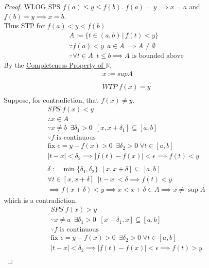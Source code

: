 \documentclass[11pt, oneside]{book}
\theoremstyle{break}
\newtheorem*{proof}{Proof}
\newcommand{\bb}[1]{\mathbb{#1}}			%
\begin{document}
\begin{proof}
	WLOG SPS $f(a) \leq y \leq f(b)$. $f(a) = y \implies x = a$ and $f(b) = y \implies x = b$. \\
	Thus STP for $f(a) < y < f(b)$
	\begin{gather*}
		A := \{t \in (a, b) \, | \, f(t) < y \} \\
		\because f(a) < y \enspace a \in A \implies A \neq \emptyset \\
		\because \forall t \in A \enspace t \leq b \implies A \text{ is bounded above}
	\end{gather*}
	By the \hyperref[completeness_R]{Completeness Property of $\bb{R}$},
	\begin{gather*}
		x := sup A \\
		\\
		WTP \; f(x) = y \\
	\end{gather*}
	Suppose, for contradiction, that $f(x) \neq y$.
	\begin{gather*}
		SPS \; f(x) < y \\
		\therefore x \in A \\
		\because x \neq b \enspace \exists \delta_1 > 0 \enspace [x, x + \delta_1] \subseteq [a, b] \\
		\because f \text{ is continuous} \\
		\text{fix } \epsilon = y - f(x) > 0 \enspace \exists \delta_2 > 0 \; \forall t \in [a, b] \\
		|t - x| < \delta_2 \implies |f(t) - f(x)| < \epsilon \implies f(t) < y \\
		\\
		\delta := \min\{\delta_1, \delta_2\} \enspace [x, x + \delta] \subseteq [a, b] \\
		\forall t \in [x, x + \delta] \enspace |t - x| < \delta \implies f(t) < y \\
		\implies f(x + \delta) < y \implies x < x + \delta \in A \implies x \neq \sup A
	\end{gather*}
	which is a contradiction.
	\begin{gather*}
		SPS \; f(x) > y \\
		\because x \neq a \enspace \exists \delta_1 > 0 \enspace [x - \delta_1, x] \subseteq [a, b] \\
		\because f \text{ is continuous} \\
		\text{fix } \epsilon = y - f(x) > 0 \enspace \exists \delta_2 > 0 \; \forall t \in [a, b] \\
		|t - x| < \delta_2 \implies |f(t) - f(x)| < \epsilon \implies f(t) > y \\

\end{gather*}
\end{proof}
\end{document}
